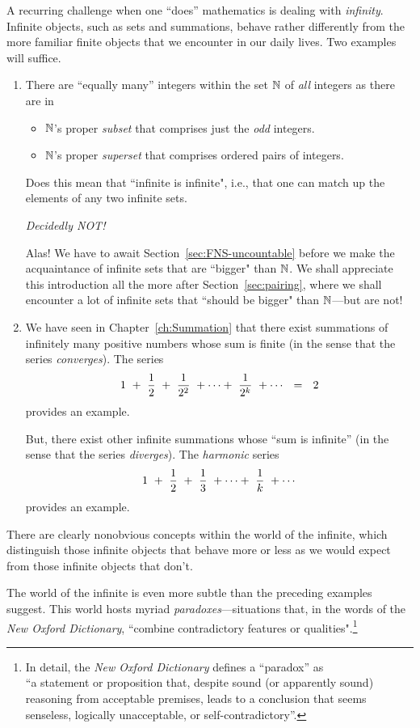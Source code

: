 A recurring challenge when one ``does'' mathematics is dealing with {\em infinity}.  Infinite objects, such as sets and summations, behave rather differently from the more familiar finite objects that we encounter in our daily lives.  Two examples will suffice.  
\begin{enumerate}
\item
There are ``equally many'' integers within the set $\mathbb{N}$ of {\em all} integers as there are in
  \begin{itemize}
  \item
$\mathbb{N}$'s proper {\em subset} that comprises just the {\em odd} integers.
  \medskip\item
$\mathbb{N}$'s proper {\em superset} that comprises ordered pairs of integers.
  \end{itemize}
Does this mean that ``infinite is infinite", i.e., that one can match up the elements of any two infinite sets.
  
\smallskip

\noindent
{\em Decidedly NOT!}

\smallskip

\noindent
Alas!  We have to await Section~\ref{sec:FNS-uncountable} before we make the acquaintance of infinite sets that are ``bigger" than $\mathbb{N}$.  We shall appreciate this introduction all the more after Section~\ref{sec:pairing}, where we shall encounter a lot of infinite sets that ``should be bigger" than $\mathbb{N}$---but are not! 


\medskip\item
We have seen in Chapter~\ref{ch:Summation} that there exist summations of infinitely many positive numbers whose sum is finite (in the sense that the series {\em converges}).  The series
\[ 1 \ + \ {1 \over 2} \ + \ {1 \over 2^2} \ + \cdots + \ {1 \over 2^k} \ + \cdots \ \ = \ \ 2 \]
provides an example.

\smallskip

But, there exist other infinite summations whose ``sum is infinite'' (in the sense that the series {\em diverges}).  The {\it harmonic} series
\[ 1 \ + \ {1 \over 2} \ + \ {1 \over 3} \ + \cdots + \ {1 \over k} \ + \cdots \]
provides an example.
\end{enumerate}
There are clearly nonobvious concepts within the world of the infinite, which distinguish those infinite objects that behave more or less as we would expect from those infinite objects that don't.

\medskip

The world of the infinite is even more subtle than the preceding examples suggest.  This world hosts myriad {\em paradoxes}---situations that, in the words of the {\it New Oxford Dictionary}, ``combine contradictory features or qualities".\footnote{In detail, the {\it New Oxford Dictionary} defines a ``paradox'' as \\
``a statement or proposition that, despite sound (or apparently sound) reasoning from acceptable premises, leads to a conclusion that seems senseless, logically unacceptable, or self-contradictory''.}

